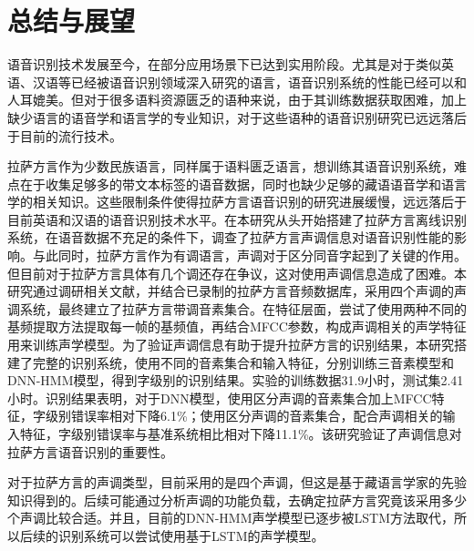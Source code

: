 
\chapter{总结与展望}
语音识别技术发展至今，在部分应用场景下已达到实用阶段。尤其是对于类似英语、汉语等已经被语音识别领域深入研究的语言，语音识别系统的性能已经可以和人耳媲美。但对于很多语料资源匮乏的语种来说，由于其训练数据获取困难，加上缺少语言的语音学和语言学的专业知识，对于这些语种的语音识别研究已远远落后于目前的流行技术。

拉萨方言作为少数民族语言，同样属于语料匮乏语言，想训练其语音识别系统，难点在于收集足够多的带文本标签的语音数据，同时也缺少足够的藏语语音学和语言学的相关知识。这些限制条件使得拉萨方言语音识别的研究进展缓慢，远远落后于目前英语和汉语的语音识别技术水平。在本研究从头开始搭建了拉萨方言离线识别系统，在语音数据不充足的条件下，调查了拉萨方言声调信息对语音识别性能的影响。与此同时，拉萨方言作为有调语言，声调对于区分同音字起到了关键的作用。但目前对于拉萨方言具体有几个调还存在争议，这对使用声调信息造成了困难。本研究通过调研相关文献，并结合已录制的拉萨方言音频数据库，采用四个声调的声调系统，最终建立了拉萨方言带调音素集合。在特征层面，尝试了使用两种不同的基频提取方法提取每一帧的基频值，再结合MFCC参数，构成声调相关的声学特征用来训练声学模型。为了验证声调信息有助于提升拉萨方言的识别结果，本研究搭建了完整的识别系统，使用不同的音素集合和输入特征，分别训练三音素模型和DNN-HMM模型，得到字级别的识别结果。实验的训练数据31.9小时，测试集2.41小时。识别结果表明，对于DNN模型，使用区分声调的音素集合加上MFCC特征，字级别错误率相对下降6.1\%；使用区分声调的音素集合，配合声调相关的输入特征，字级别错误率与基准系统相比相对下降11.1\%。该研究验证了声调信息对拉萨方言语音识别的重要性。

对于拉萨方言的声调类型，目前采用的是四个声调，但这是基于藏语言学家的先验知识得到的。后续可能通过分析声调的功能负载，去确定拉萨方言究竟该采用多少个声调比较合适。并且，目前的DNN-HMM声学模型已逐步被LSTM方法取代，所以后续的识别系统可以尝试使用基于LSTM的声学模型。
